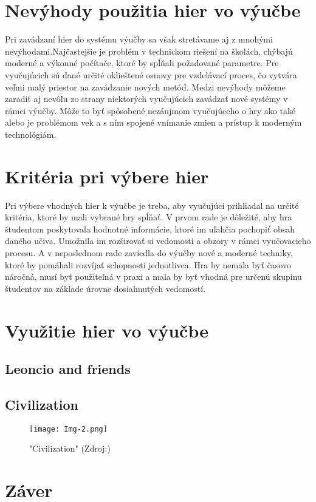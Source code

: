 \documentclass[10pt,twoside,slovak,a4paper]{article}
\begin{document}
\section{Nevýhody použitia hier vo výučbe} \label{nevyhody}

Pri zavádzaní hier do systému výučby sa však stretávame aj z mnohými nevýhodami.Najčastejšie je problém v technickom riešení na školách, chýbajú moderné a výkonné počítače, ktoré by spĺňali požadované parametre\cite{Videohry}. Pre vyučujúcich sú dané určité oklieštené osnovy pre vzdelávací proces, čo vytvára veľmi malý priestor na zavádzanie nových metód. Medzi nevýhody môžeme zaradiť aj nevôľu zo strany niektorých vyučujúcich zavádzať nové systémy v rámci výučby. Môže to byť spôsobené nezáujmom vyučujúceho o hry ako také alebo je problémom vek a s ním spojené vnímanie zmien a prístup k moderným technológiám.

\section{Kritéria pri výbere hier} \label{kriteria}

Pri výbere vhodných hier k výučbe je treba, aby vyučujúci prihliadal na určité kritéria, ktoré by mali vybrané hry spĺňať. V prvom rade je dôležité, aby hra študentom poskytovala hodnotné informácie, ktoré im uľahčia pochopiť obsah daného učiva. Umožnila im rozširovať si vedomosti a obzory v rámci vyučovacieho procesu. A v neposlednom rade zaviedla do výučby nové a moderné techniky, ktoré by pomáhali rozvíjať schopnosti jednotlivca. Hra by nemala byť časovo náročná, musí byť použiteľná v praxi a mala by byť vhodná pre určenú skupinu študentov na základe úrovne dosiahnutých vedomostí.

\section{Využitie hier vo výučbe} \label{vyuzitie}

\subsection{Leoncio and friends} \label{hra-1}


\subsection{Civilization} \label{hra-2}

\begin{figure}[tbh]
	\centering
	\texttt{[image: Img-2.png]}
	\caption{"Civilization" (Zdroj:\cite{Img-Civil})}
	\label{obr-2}
\end{figure}
\section{Záver}



\end{document}
